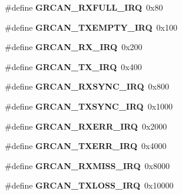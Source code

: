 \begin{DoxyCompactItemize}
\item 
\mbox{\label{group__can_ga01416ab763d0fb86393e6ef987f5af6f}} 
\#define {\bfseries G\+R\+C\+A\+N\+\_\+\+R\+X\+F\+U\+L\+L\+\_\+\+I\+RQ}~0x80
\item 
\mbox{\label{group__can_gaa9d4b040931fb6b04b7a63e1f8f9d251}} 
\#define {\bfseries G\+R\+C\+A\+N\+\_\+\+T\+X\+E\+M\+P\+T\+Y\+\_\+\+I\+RQ}~0x100
\item 
\mbox{\label{group__can_gac04f4fd11a16551d86c42c1d193bfd63}} 
\#define {\bfseries G\+R\+C\+A\+N\+\_\+\+R\+X\+\_\+\+I\+RQ}~0x200
\item 
\mbox{\label{group__can_ga152d4ec10036f8a246c5785dc662a8fe}} 
\#define {\bfseries G\+R\+C\+A\+N\+\_\+\+T\+X\+\_\+\+I\+RQ}~0x400
\item 
\mbox{\label{group__can_gaa6e9c31968f1ac44cc3b731219bcdf9e}} 
\#define {\bfseries G\+R\+C\+A\+N\+\_\+\+R\+X\+S\+Y\+N\+C\+\_\+\+I\+RQ}~0x800
\item 
\mbox{\label{group__can_gae3fa3a96c04c245a69da6f9a11cda6a3}} 
\#define {\bfseries G\+R\+C\+A\+N\+\_\+\+T\+X\+S\+Y\+N\+C\+\_\+\+I\+RQ}~0x1000
\item 
\mbox{\label{group__can_ga340a28cf8fcc18e793fda8c1357507a7}} 
\#define {\bfseries G\+R\+C\+A\+N\+\_\+\+R\+X\+E\+R\+R\+\_\+\+I\+RQ}~0x2000
\item 
\mbox{\label{group__can_ga8708a428d57b48c2ae5e2bc391c97221}} 
\#define {\bfseries G\+R\+C\+A\+N\+\_\+\+T\+X\+E\+R\+R\+\_\+\+I\+RQ}~0x4000
\item 
\mbox{\label{group__can_ga5dc3af7f90ffef0dc7a225a2c442f6d5}} 
\#define {\bfseries G\+R\+C\+A\+N\+\_\+\+R\+X\+M\+I\+S\+S\+\_\+\+I\+RQ}~0x8000
\item 
\mbox{\label{group__can_ga72f95bca331d20097904bf9d22bf9630}} 
\#define {\bfseries G\+R\+C\+A\+N\+\_\+\+T\+X\+L\+O\+S\+S\+\_\+\+I\+RQ}~0x10000
\item 
\mbox{\label{group__can_ga3a5443516594e08d23488475063096af}} 

\end{DoxyCompactItemize}
